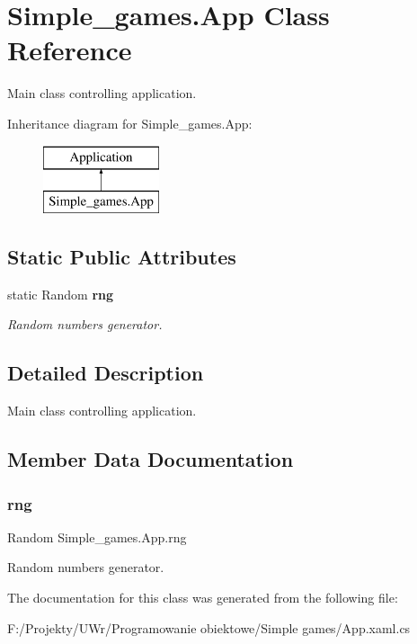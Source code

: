 \section{Simple\+\_\+games.\+App Class Reference}
\label{class_simple__games_1_1_app}


Main class controlling application.  


Inheritance diagram for Simple\+\_\+games.\+App\+:\begin{figure}[H]
\begin{center}
\leavevmode
\includegraphics[height=2.000000cm]{class_simple__games_1_1_app}
\end{center}
\end{figure}
\subsection*{Static Public Attributes}
\begin{DoxyCompactItemize}
\item 
static Random \textbf{ rng}
\begin{DoxyCompactList}\small\item\em Random numbers generator. \end{DoxyCompactList}\end{DoxyCompactItemize}


\subsection{Detailed Description}
Main class controlling application. 



\subsection{Member Data Documentation}
\mbox{\label{class_simple__games_1_1_app_a864a925de1376bf27895c836c8b39aa0}} 
\subsubsection{rng}
{\footnotesize\ttfamily Random Simple\+\_\+games.\+App.\+rng\hspace{0.3cm}{\ttfamily [static]}}



Random numbers generator. 



The documentation for this class was generated from the following file\+:\begin{DoxyCompactItemize}
\item 
F\+:/\+Projekty/\+U\+Wr/\+Programowanie obiektowe/\+Simple games/App.\+xaml.\+cs\end{DoxyCompactItemize}
